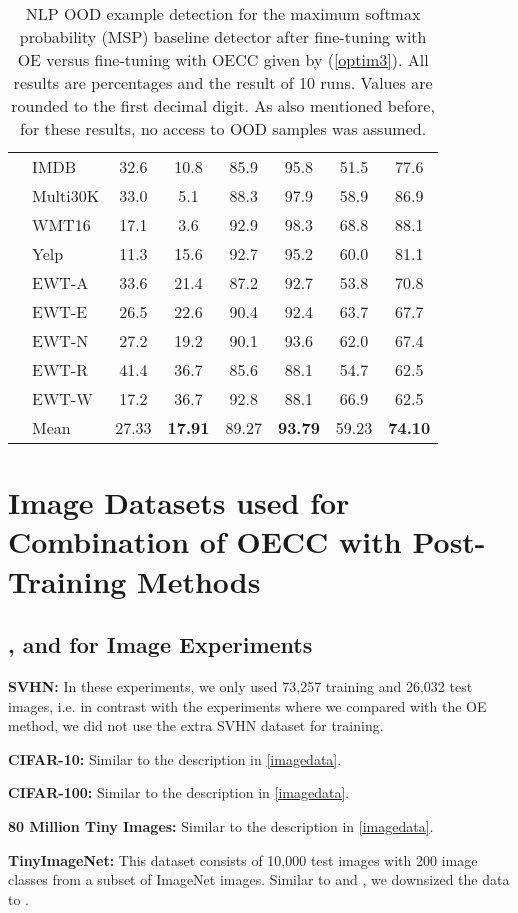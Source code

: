 \documentclass{article} \usepackage{iclr2020_conference,times}
\begin{document}
\begin{table}[h]
\begin{center}
\begin{tabular}{cl|cc|cc|cc}
&IMDB&32.6&10.8&85.9&95.8&51.5&77.6\\
&Multi30K   &33.0&5.1&88.3&97.9&58.9&86.9\\
&WMT16&17.1&3.6&92.9&98.3&68.8&88.1\\
&Yelp&11.3&15.6&92.7&95.2&60.0&81.1\\
&EWT-A&33.6&21.4&87.2&92.7&53.8&70.8\\
&EWT-E    &26.5&22.6&90.4&92.4&63.7&67.7\\
&EWT-N&27.2&19.2&90.1&93.6&62.0&67.4\\
&EWT-R&41.4&36.7&85.6&88.1&54.7&62.5\\
&EWT-W&17.2&36.7&92.8&88.1&66.9&62.5\\
\hline
&Mean&27.33&\textbf{17.91}&89.27&\textbf{93.79}&59.23&\textbf{74.10}\\
\bottomrule[1.5pt]
\end{tabular}
\end{center}
\caption{\label{NLP_table}NLP OOD example detection for the maximum softmax probability (MSP) baseline detector after fine-tuning with OE \citep{hendrycks2019oe} versus fine-tuning with OECC given by (\ref{optim3}). All results are percentages and the result of 10 runs. Values are rounded to the first decimal digit. As also mentioned before, for these results, no access to OOD samples was assumed.}
\end{table}


\section{Image Datasets used for Combination of OECC with Post-Training Methods}
\subsection{,  and  for Image Experiments}\label{post_image_data}

\textbf{SVHN:} In these experiments, we only used 73,257 training and 26,032 test images, i.e. in contrast with the experiments where we compared with the OE method, we did not use the extra SVHN dataset for training.  

\textbf{CIFAR-10:} Similar to the description in \ref{imagedata}.


\textbf{CIFAR-100:} Similar to the description in \ref{imagedata}.


\textbf{80 Million Tiny Images: }Similar to the description in \ref{imagedata}. 

\textbf{TinyImageNet: }This dataset consists of 10,000 test images with 200 image classes from a subset of ImageNet images. Similar to \cite{Lee:2018:SUF:3327757.3327819} and \cite{ch2019detecting}, we downsized the data to .
\end{document}
